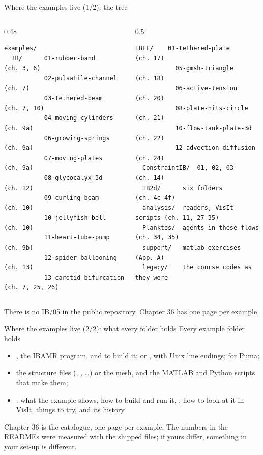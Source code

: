 \documentclass[aspectratio=169,11pt]{beamer}
\begin{document}
\begin{frame}[fragile]{Where the examples live (1/2): the tree}
\label{fr:tree}
\begin{columns}[T,onlytextwidth]
\begin{column}{0.48\textwidth}
\begin{lstlisting}[style=shell,basicstyle=\ttfamily\tiny\color{BlackGray}]
examples/
  IB/      01-rubber-band         (ch. 3, 6)
           02-pulsatile-channel   (ch. 7)
           03-tethered-beam       (ch. 7, 10)
           04-moving-cylinders    (ch. 9a)
           06-growing-springs     (ch. 9a)
           07-moving-plates       (ch. 9a)
           08-glycocalyx-3d       (ch. 12)
           09-curling-beam        (ch. 10)
           10-jellyfish-bell      (ch. 10)
           11-heart-tube-pump     (ch. 9b)
           12-spider-ballooning   (ch. 13)
           13-carotid-bifurcation (ch. 7, 25, 26)
\end{lstlisting}
\end{column}
\begin{column}{0.5\textwidth}
\begin{lstlisting}[style=shell,basicstyle=\ttfamily\tiny\color{BlackGray}]
  IBFE/    01-tethered-plate      (ch. 17)
           05-gmsh-triangle       (ch. 18)
           06-active-tension      (ch. 20)
           08-plate-hits-circle   (ch. 21)
           10-flow-tank-plate-3d  (ch. 22)
           12-advection-diffusion (ch. 24)
  ConstraintIB/  01, 02, 03       (ch. 14)
  IB2d/      six folders          (ch. 4c-4f)
  analysis/  readers, VisIt scripts (ch. 11, 27-35)
  Planktos/  agents in these flows  (ch. 34, 35)
  support/   matlab-exercises     (App. A)
  legacy/    the course codes as they were
\end{lstlisting}
\end{column}
\end{columns}
\vspace{1mm}
\small There is no IB/05 in the public repository. Chapter 36 has one page per example.
\end{frame}

\begin{frame}{Where the examples live (2/2): what every folder holds}
\label{fr:folders}
\small Every example folder holds
\begin{itemize}
  \item {}, the IBAMR program, and  to build it;  or , with Unix line endings;  for Puma;
  \item the structure files (, , \ldots) or the mesh, and the MATLAB and Python scripts that make them;
  \item {}: what the example shows, how to build and run it, , how to look at it in VisIt, things to try, and its history.
\end{itemize}
\begin{punchbox}
\small Chapter 36 is the catalogue, one page per example. The numbers in the READMEs were measured with the shipped files; if yours differ, something in your set-up is different.
\end{punchbox}
\end{frame}
\end{document}
